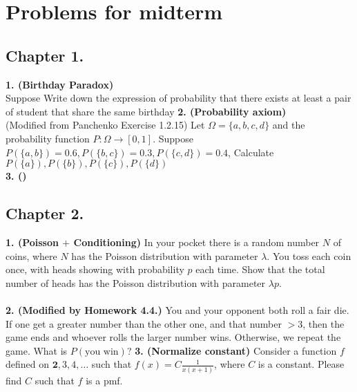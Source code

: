 \documentclass[12pt]{article}
\begin{document}
\section*{Problems for midterm}
\subsection*{Chapter 1.}
\textbf{1. (Birthday Paradox)}\\
Suppose   Write down the expression of probability that there exists at least a pair of student that share the same birthday
\textbf{2. (Probability axiom)}\\
(Modified from Panchenko Exercise 1.2.15)
Let \(\Omega  = \{a,b,c,d\}\) and the probability function \(P: \Omega \to [0,1]\). 
Suppose \(P(\{a,b\}) = 0.6, P(\{b,c\}) = 0.3, P(\{c,d\}) = 0.4\), Calculate \(P(\{a\}), P(\{b\}), P(\{c\}), P(\{d\})\)
\\
\textbf{3. ()} 
 
\subsection*{Chapter 2.}
\textbf{1. (Poisson $+$ Conditioning)} In your pocket there is a random number $N$ of coins, where $N$ has the Poisson distribution with parameter $\lambda$. You toss each coin once, with heads showing with probability $p$ each time. Show that the total number of heads has the Poisson distribution with parameter $\lambda p$. \\ \\

\textbf{2. (Modified by Homework 4.4.)} You and your opponent both roll a fair die. If one get a greater number than the other one, and that number $>3$, then the game ends and whoever rolls the larger number wins. Otherwise, we repeat the game. What is $P(\text{you win})$?
\textbf{3. (Normalize constant)}
Consider a function \(f\) defined on \(\textbf{2},3,4,\dots\) such that \(f(x) = C \frac{1}{x(x+1)}\), where \(C\) is a constant. Please find \(C\) such that \(f\) is a pmf. 
\end{document}
